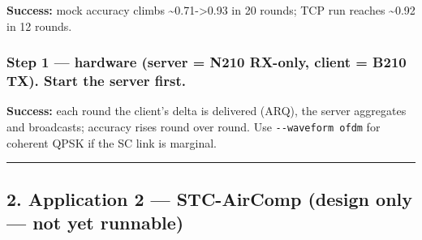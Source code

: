 \documentclass[
  9.5pt,
]{article}
\newenvironment{Shaded}{\begin{snugshade}}{\end{snugshade}}
\newcommand{\AttributeTok}[1]{\textcolor[rgb]{0.77,0.63,0.00}{#1}}
\newcommand{\CommentTok}[1]{\textcolor[rgb]{0.56,0.35,0.01}{\textit{#1}}}
\newcommand{\DataTypeTok}[1]{\textcolor[rgb]{0.13,0.29,0.53}{#1}}
\newcommand{\ExtensionTok}[1]{#1}
\newcommand{\NormalTok}[1]{#1}
\newcommand{\VariableTok}[1]{\textcolor[rgb]{0.00,0.00,0.00}{#1}}
\begin{document}
\textbf{Success:} mock accuracy climbs
\textasciitilde0.71-\textgreater0.93 in 20 rounds; TCP run reaches
\textasciitilde0.92 in 12 rounds.

\hypertarget{step-1--hardware-server--n210-rx-only-client--b210-tx-start-the-server-first}{%
\subsubsection{Step 1 --- hardware (server = N210 RX-only, client = B210
TX). Start the server
first.}\label{step-1--hardware-server--n210-rx-only-client--b210-tx-start-the-server-first}}

\begin{Shaded}
\end{Shaded}

\textbf{Success:} each round the client's delta is delivered (ARQ), the
server aggregates and broadcasts; accuracy rises round over round. Use
\texttt{-\/-waveform\ ofdm} for coherent QPSK if the SC link is
marginal.

\begin{center}\rule{0.5\linewidth}{0.5pt}\end{center}

\hypertarget{2-application-2--stc-aircomp-design-only--not-yet-runnable}{%
\subsection{2. Application 2 --- STC-AirComp (design only --- not yet
runnable)}\label{2-application-2--stc-aircomp-design-only--not-yet-runnable}}
\end{document}
